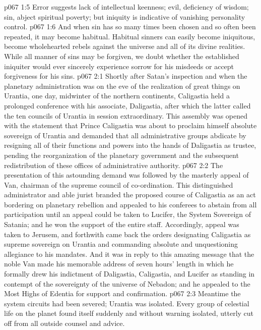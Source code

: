 \vs p067 1:5 Error suggests lack of intellectual keenness; evil, deficiency of wisdom; sin, abject spiritual poverty; but iniquity is indicative of vanishing personality control.
\vs p067 1:6 And when sin has so many times been chosen and so often been repeated, it may become habitual. Habitual sinners can easily become iniquitous, become wholehearted rebels against the universe and all of its divine realities. While all manner of sins may be forgiven, we doubt whether the established iniquiter would ever sincerely experience sorrow for his misdeeds or accept forgiveness for his sins.
\vs p067 2:1 Shortly after Satan’s inspection and when the planetary administration was on the eve of the realization of great things on Urantia, one day, midwinter of the northern continents, Caligastia held a prolonged conference with his associate, Daligastia, after which the latter called the ten councils of Urantia in session extraordinary. This assembly was opened with the statement that Prince Caligastia was about to proclaim himself absolute sovereign of Urantia and demanded that all administrative groups abdicate by resigning all of their functions and powers into the hands of Daligastia as trustee, pending the reorganization of the planetary government and the subsequent redistribution of these offices of administrative authority.
\vs p067 2:2 The presentation of this astounding demand was followed by the masterly appeal of Van, chairman of the supreme council of co\hyp{}ordination. This distinguished administrator and able jurist branded the proposed course of Caligastia as an act bordering on planetary rebellion and appealed to his conferees to abstain from all participation until an appeal could be taken to Lucifer, the System Sovereign of Satania; and he won the support of the entire staff. Accordingly, appeal was taken to Jerusem, and forthwith came back the orders designating Caligastia as supreme sovereign on Urantia and commanding absolute and unquestioning allegiance to his mandates. And it was in reply to this amazing message that the noble Van made his memorable address of seven hours’ length in which he formally drew his indictment of Daligastia, Caligastia, and Lucifer as standing in contempt of the sovereignty of the universe of Nebadon; and he appealed to the Most Highs of Edentia for support and confirmation.\plusone
\pc \vs p067 2:3 Meantime the system circuits had been severed; Urantia was isolated. Every group of celestial life on the planet found itself suddenly and without warning isolated, utterly cut off from all outside counsel and advice.
